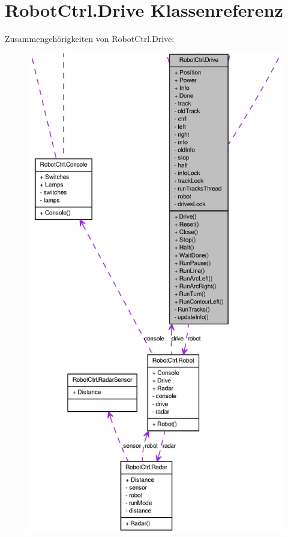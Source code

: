 \hypertarget{class_robot_ctrl_1_1_drive}{
\section{RobotCtrl.Drive Klassenreferenz}
\label{class_robot_ctrl_1_1_drive}
}


Zusammengehörigkeiten von RobotCtrl.Drive:\nopagebreak
\begin{figure}[H]
\begin{center}
\leavevmode
\includegraphics[width=400pt]{class_robot_ctrl_1_1_drive__coll__graph}
\end{center}
\end{figure}
